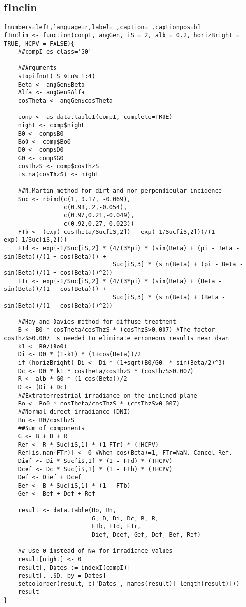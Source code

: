 \subsection{fInclin}
\label{sec:orgabcdd6c}
\begin{lstlisting}[numbers=left,language=r,label= ,caption= ,captionpos=b]
fInclin <- function(compI, angGen, iS = 2, alb = 0.2, horizBright = TRUE, HCPV = FALSE){
    ##compI es class='G0'

    ##Arguments
    stopifnot(iS %in% 1:4)
    Beta <- angGen$Beta
    Alfa <- angGen$Alfa
    cosTheta <- angGen$cosTheta

    comp <- as.data.tableI(compI, complete=TRUE)
    night <- comp$night
    B0 <- comp$B0
    Bo0 <- comp$Bo0
    D0 <- comp$D0
    G0 <- comp$G0
    cosThzS <- comp$cosThzS
    is.na(cosThzS) <- night

    ##N.Martin method for dirt and non-perpendicular incidence
    Suc <- rbind(c(1, 0.17, -0.069),
                 c(0.98,.2,-0.054),
                 c(0.97,0.21,-0.049),
                 c(0.92,0.27,-0.023))
    FTb <- (exp(-cosTheta/Suc[iS,2]) - exp(-1/Suc[iS,2]))/(1 - exp(-1/Suc[iS,2]))
    FTd <- exp(-1/Suc[iS,2] * (4/(3*pi) * (sin(Beta) + (pi - Beta - sin(Beta))/(1 + cos(Beta))) +
                               Suc[iS,3] * (sin(Beta) + (pi - Beta - sin(Beta))/(1 + cos(Beta)))^2))
    FTr <- exp(-1/Suc[iS,2] * (4/(3*pi) * (sin(Beta) + (Beta - sin(Beta))/(1 - cos(Beta))) +
                               Suc[iS,3] * (sin(Beta) + (Beta - sin(Beta))/(1 - cos(Beta)))^2))

    ##Hay and Davies method for diffuse treatment
    B <- B0 * cosTheta/cosThzS * (cosThzS>0.007) #The factor cosThzS>0.007 is needed to eliminate erroneous results near dawn
    k1 <- B0/(Bo0)
    Di <- D0 * (1-k1) * (1+cos(Beta))/2
    if (horizBright) Di <- Di * (1+sqrt(B0/G0) * sin(Beta/2)^3)
    Dc <- D0 * k1 * cosTheta/cosThzS * (cosThzS>0.007)
    R <- alb * G0 * (1-cos(Beta))/2
    D <- (Di + Dc)
    ##Extraterrestrial irradiance on the inclined plane
    Bo <- Bo0 * cosTheta/cosThzS * (cosThzS>0.007) 
    ##Normal direct irradiance (DNI)
    Bn <- B0/cosThzS
    ##Sum of components
    G <- B + D + R
    Ref <- R * Suc[iS,1] * (1-FTr) * (!HCPV)
    Ref[is.nan(FTr)] <- 0 #When cos(Beta)=1, FTr=NaN. Cancel Ref.
    Dief <- Di * Suc[iS,1] * (1 - FTd) * (!HCPV)
    Dcef <- Dc * Suc[iS,1] * (1 - FTb) * (!HCPV)
    Def <- Dief + Dcef
    Bef <- B * Suc[iS,1] * (1 - FTb)
    Gef <- Bef + Def + Ref

    result <- data.table(Bo, Bn,
                         G, D, Di, Dc, B, R,
                         FTb, FTd, FTr,
                         Dief, Dcef, Gef, Def, Bef, Ref) 

    ## Use 0 instead of NA for irradiance values
    result[night] <- 0
    result[, Dates := indexI(compI)]
    result[, .SD, by = Dates]
    setcolorder(result, c('Dates', names(result)[-length(result)]))
    result
}
\end{lstlisting}
